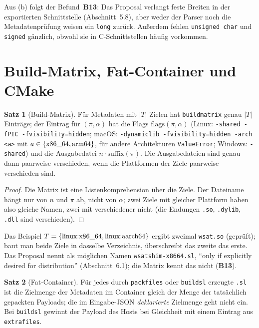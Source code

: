 \documentclass[a4paper,12pt,twoside]{report}
\DeclareRobustCommand{\_}{\ifmmode\mbox{\textunderscore}\else\textunderscore\allowbreak{}\fi}
\theoremstyle{definition}
\newtheorem{satz}{Satz}[chapter]
\newcommand{\Bf}[1]{\textbf{B#1}}
\begin{document}
Aus (b) folgt der Befund~\Bf{13}: Das Proposal verlangt feste Breiten in der exportierten Schnittstelle (Abschnitt~5.8), aber weder der Parser noch die Metadatenprüfung weisen ein \texttt{long} zurück. Außerdem fehlen \texttt{unsigned char} und \texttt{signed} gänzlich, obwohl sie in C-Schnittstellen häufig vorkommen.

\section{Build-Matrix, Fat-Container und CMake}

\begin{satz}[Build-Matrix]
	\label{satz:matrix}
	Für Metadaten mit $|T|$ Zielen hat \texttt{build\_matrix} genau $|T|$ Einträge; der Eintrag für $(\pi,\alpha)$ hat die Flags $\mathrm{flags}(\pi,\alpha)$ (Linux: \texttt{-shared -fPIC -fvisibility=hidden}; macOS: \texttt{-dynamiclib -fvisibility=hidden -arch <a>} mit $a\in\{\text{x86\_64},\text{arm64}\}$, für andere Architekturen \texttt{ValueError}; Windows: \texttt{-shared}) und die Ausgabedatei $n\cdot\mathrm{suffix}(\pi)$. Die Ausgabedateien sind genau dann paarweise verschieden, wenn die Plattformen der Ziele paarweise verschieden sind.
\end{satz}

\begin{proof}
	Die Matrix ist eine Listenkomprehension über die Ziele. Der Dateiname hängt nur von $n$ und $\pi$ ab, nicht von $\alpha$; zwei Ziele mit gleicher Plattform haben also gleiche Namen, zwei mit verschiedener nicht (die Endungen \texttt{.so}, \texttt{.dylib}, \texttt{.dll} sind verschieden).
\end{proof}

Das Beispiel $T=\{\text{linux:x86\_64},\text{linux:aarch64}\}$ ergibt zweimal \texttt{wsat.so} (geprüft); baut man beide Ziele in dasselbe Verzeichnis, überschreibt das zweite das erste. Das Proposal nennt als möglichen Namen \texttt{wsat\_shim-x86\_64.sl}, ``only if explicitly desired for distribution'' (Abschnitt~6.1); die Matrix kennt das nicht (\Bf{13}).

\begin{satz}[Fat-Container]
	\label{satz:fat}
	Für jedes durch \texttt{pack\_files} oder \texttt{build\_sl} erzeugte \texttt{.sl} ist die Zielmenge der Metadaten im Container gleich der Menge der tatsächlich gepackten Payloads; die im Eingabe-JSON \emph{deklarierte} Zielmenge geht nicht ein. Bei \texttt{build\_sl} gewinnt der Payload des Hosts bei Gleichheit mit einem Eintrag aus \texttt{extra\_files}.
\end{satz}
\end{document}
